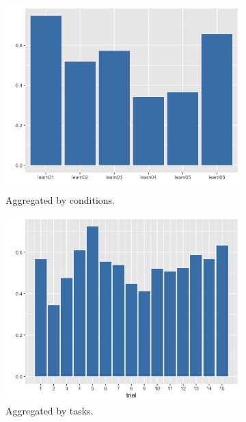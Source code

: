 \documentclass{article}
\begin{document}
\begin{figure}[h!]
  \centering
  \begin{subfigure}[t]{0.32\textwidth}
    \centering
    \includegraphics[width=\linewidth]{var_conditions} 
    \caption{Aggregated by conditions.}
  \end{subfigure}
  \hfill
  \begin{subfigure}[t]{0.32\textwidth}
    \centering
    \includegraphics[width=\linewidth]{var_trials} 
    \caption{Aggregated by tasks.}
  \end{subfigure}
  \hfill
  \begin{subfigure}[t]{0.33\textwidth}
    \centering

\end{subfigure}
\end{figure}
\end{document}
